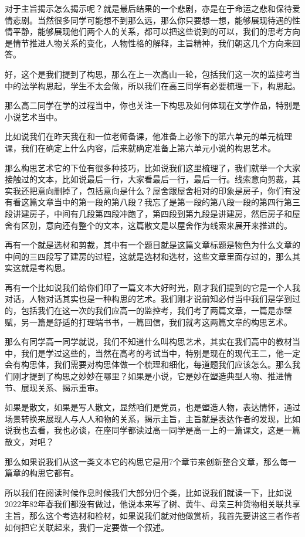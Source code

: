 \documentclass{ctexart}
\renewcommand{\\}{\par}
\begin{document}
对于主旨揭示怎么揭示呢？就是最后结果的一个悲剧，亦是在于命运之悲和保待爱情悲剧。当然很多同学可能想不到那么远，那么你只要想一想，能够展现待遇的性情平静，能够展现他们两个人的关系，都可以把这些说到的可以，我们的思考方向是情节推进人物关系的变化，人物性格的解释，主旨精神，我们朝这几个方向来回答。

好，这个是我们提到了构思，那么在上一次高山一轮，包括我们这一次的监控考当中的法学构思起，学生不太会做，所以我们在高三同学有必要梳理一下，构思起。

那么高二同学在学的过程当中，你也关注一下构思及如何体现在文学作品，特别是小说艺术当中。

比如说我们在昨天我在和一位老师备课，他准备上必修下的第六单元的单元梳理课，我们在确定上什么内容，后来就确定准备上第六单元小说的构思艺术。

那么构思艺术它的下位有很多种技巧，比如说我们这里梳理了，我们就举一个大家接触过的文本，比如说最后一行，大家看最后一行，最后一行。线索意向剪裁，其实我还把意向删掉了，包括意向是什么？屋舍跟屋舍相对的印象是房子，你们有没有看这篇文章当中的第一段的第八段？我忘了是第一段的第八段一段的第四行第三段讲建房子，中间有几段第四段冲跑了，第四段到第九段是讲建房，然后房子和屋舍有区别，意向还有整个的文本，这篇散文是以屋舍作为线索来展开来推进的。

再有一个就是选材和剪裁，其中有一个题目就是这篇文章标题是物色为什么文章的中间的三四段写了建房的过程，这就是选材和选材，这些文章里面存过的，那么其实这就是考构思。

再有一个比如说我们给你们印了一篇文本大好时光，刚才我们提到的它是一个人我对话，人物对话其实也是一种构思的艺术。我们刚才说前知必付当中我们是学到过的，包括我们在这一次的我们应高一的监控考，我们考了两篇文章，一篇是赤壁赋，另一篇是舒适的打理端书书，一篇回信，我们就考这两篇文章的构思艺术。

那么有同学高一同学就说，我们不知道什么叫构思艺术，其实在我们高中的教材当中，我们是学过这些的，当然在高考的考试当中，特别是现在的现代王二，他一定会有构思体，我们需要对构思体做一个梳理和细化，每道题我们应该怎么。那么我们刚才提到了构思之妙妙在哪里？如果是小说，它是妙在塑造典型人物、推进情节、展现关系、揭示重审。

如果是散文，如果是写人散文，显然咱们是党员，也是塑造人物，表达情怀，通过场景转换来展现人与人人和物的关系，揭示主旨，主旨就是表达作者的发现，比如说我也去看，我也必谈，在座同学都读过高一同学是高一上的一篇课文，这是一篇散文，对吧？

那么如果说我们从这一类文本它的构思它是用7个章节来创新整合文章，那么每一篇章的构思它都有。

所以我们在阅读时候作息时候我们大部分归个类，比如说我们就读一下，比如说2022年82年春我们都没有做过，他说本来写了树、黄牛、母亲三种货物相关联共享主旨，那么这个考选材和检材，如果说我们就对他做赏析，我首先要讲这三者作者如何把它关联起来，我们一定要做一个叙述。
\end{document}
